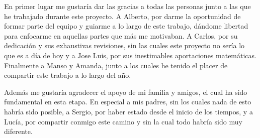 En primer lugar me gustaría dar las gracias a todas las personas junto a las que
he trabajado durante este proyecto.
A Alberto, por darme la oportunidad de formar parte del equipo y
guiarme a lo largo de este trabajo, dándome libertad
para enfocarme en aquellas partes que más me motivaban. A Carlos, por su dedicación
y sus exhaustivas revisiones, sin las cuales este proyecto no sería lo que es
a día de hoy y a Jose Luis, por sus inestimables aportaciones
matemáticas. Finalmente a Manso y Amanda, junto a los
cuales he tenido el placer de compartir este trabajo a lo largo del año.

Además me gustaría agradecer el apoyo de mi familia y amigos, el cual ha
sido fundamental en esta etapa. En especial a mis padres, sin los
cuales nada de esto habría sido posible, a Sergio, por haber estado
desde el inicio de los tiempos, y a Lucía, por compartir conmigo este
camino y sin la cual todo habría sido muy diferente.
